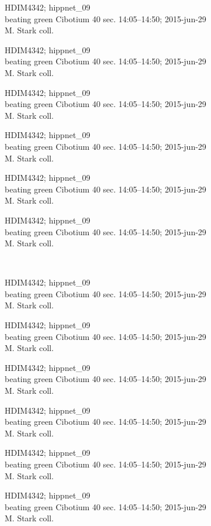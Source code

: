 \documentclass[2pt]{extarticle}
\begin{document}
\noindent
\parbox{0.16\textwidth}{\tiny \raggedright \rule[-0.3\baselineskip]{0pt}{10pt}HDIM4342; hippnet\_09\\ beating green Cibotium 40 sec. 14:05--14:50; 2015-jun-29\\ M. Stark coll.}
\parbox{0.16\textwidth}{\tiny \raggedright \rule[-0.3\baselineskip]{0pt}{10pt}HDIM4342; hippnet\_09\\ beating green Cibotium 40 sec. 14:05--14:50; 2015-jun-29\\ M. Stark coll.}
\parbox{0.16\textwidth}{\tiny \raggedright \rule[-0.3\baselineskip]{0pt}{10pt}HDIM4342; hippnet\_09\\ beating green Cibotium 40 sec. 14:05--14:50; 2015-jun-29\\ M. Stark coll.}
\parbox{0.16\textwidth}{\tiny \raggedright \rule[-0.3\baselineskip]{0pt}{10pt}HDIM4342; hippnet\_09\\ beating green Cibotium 40 sec. 14:05--14:50; 2015-jun-29\\ M. Stark coll.}
\parbox{0.16\textwidth}{\tiny \raggedright \rule[-0.3\baselineskip]{0pt}{10pt}HDIM4342; hippnet\_09\\ beating green Cibotium 40 sec. 14:05--14:50; 2015-jun-29\\ M. Stark coll.}
\parbox{0.16\textwidth}{\tiny \raggedright \rule[-0.3\baselineskip]{0pt}{10pt}HDIM4342; hippnet\_09\\ beating green Cibotium 40 sec. 14:05--14:50; 2015-jun-29\\ M. Stark coll.} \\ 
\vspace{0.001in} 

\noindent
\parbox{0.16\textwidth}{\tiny \raggedright \rule[-0.3\baselineskip]{0pt}{10pt}HDIM4342; hippnet\_09\\ beating green Cibotium 40 sec. 14:05--14:50; 2015-jun-29\\ M. Stark coll.}
\parbox{0.16\textwidth}{\tiny \raggedright \rule[-0.3\baselineskip]{0pt}{10pt}HDIM4342; hippnet\_09\\ beating green Cibotium 40 sec. 14:05--14:50; 2015-jun-29\\ M. Stark coll.}
\parbox{0.16\textwidth}{\tiny \raggedright \rule[-0.3\baselineskip]{0pt}{10pt}HDIM4342; hippnet\_09\\ beating green Cibotium 40 sec. 14:05--14:50; 2015-jun-29\\ M. Stark coll.}
\parbox{0.16\textwidth}{\tiny \raggedright \rule[-0.3\baselineskip]{0pt}{10pt}HDIM4342; hippnet\_09\\ beating green Cibotium 40 sec. 14:05--14:50; 2015-jun-29\\ M. Stark coll.}
\parbox{0.16\textwidth}{\tiny \raggedright \rule[-0.3\baselineskip]{0pt}{10pt}HDIM4342; hippnet\_09\\ beating green Cibotium 40 sec. 14:05--14:50; 2015-jun-29\\ M. Stark coll.}
\parbox{0.16\textwidth}{\tiny \raggedright \rule[-0.3\baselineskip]{0pt}{10pt}HDIM4342; hippnet\_09\\ beating green Cibotium 40 sec. 14:05--14:50; 2015-jun-29\\ M. Stark coll.} \\ 
\vspace{0.001in} 
\end{document}
